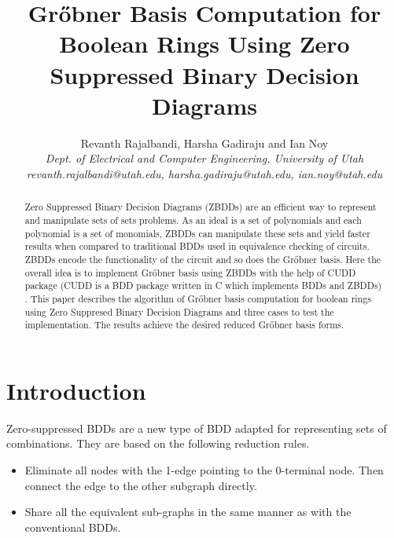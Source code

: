 \documentclass[letterpaper, 10 pt, conference]{ieeeconf}
\begin{document}
\title{
Gr{\H o}bner Basis Computation for Boolean Rings Using Zero Suppressed Binary Decision Diagrams
}

\author{Revanth Rajalbandi, Harsha Gadiraju and Ian Noy\\
 	\textit{Dept. of Electrical and Computer Engineering, University of Utah}\\
 	\textit{revanth.rajalbandi@utah.edu, harsha.gadiraju@utah.edu, ian.noy@utah.edu}
}
\maketitle




\begin{abstract}
Zero Suppressed Binary Decision Diagrams (ZBDDs) are an efficient way to represent and manipulate sets of sets problems. As an ideal is a set of polynomials and each polynomial is a set of monomials, ZBDDs can manipulate these sets and yield faster results when compared to traditional BDDs used in equivalence checking of circuits. ZBDDs encode the functionality of the circuit and so does the Gr{\H o}bner basis. Here the overall idea is to implement Gr{\H o}bner basis using ZBDDs with the help of CUDD package (CUDD is a BDD package written in C which implements BDDs and ZBDDs) \cite{somenzi1998cudd}.  This paper describes the algorithm of Gr{\H o}bner basis computation for boolean rings using Zero Suppresed Binary Decision Diagrams and three cases to test the implementation.  The results achieve the desired reduced Gr{\H o}bner basis forms.
\end{abstract}




\section{Introduction}
\label{sec:intro}
Zero-suppressed BDDs are a new type of BDD adapted for representing sets of combinations. They are based on the following reduction rules.

\begin{itemize}
	\item Eliminate all nodes with the 1-edge pointing to the 0-terminal node. Then connect the edge to the other subgraph directly.
	\item Share all the equivalent sub-graphs in the same manner as with the conventional BDDs.
\end{itemize}
\end{document}
